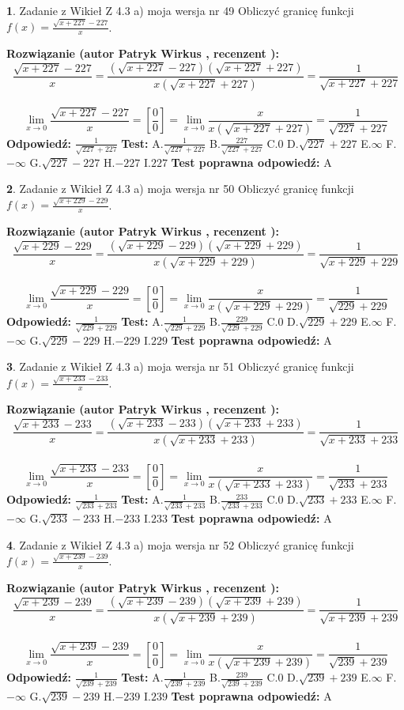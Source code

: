 \documentclass[12pt, a4paper]{article}
\theoremstyle{definition} %
\newtheorem{zad}{}
\newcommand{\zadStart}[1]{\begin{zad}#1\newline}
\newcommand{\zadStop}{\end{zad}}
\newcommand{\rozwStart}[2]{\noindent \textbf{Rozwiązanie (autor #1 , recenzent #2): }\newline}
\newcommand{\rozwStop}{\newline}
\newcommand{\odpStart}{\noindent \textbf{Odpowiedź:}\newline}
\newcommand{\odpStop}{\newline}
\newcommand{\testStart}{\noindent \textbf{Test:}\newline}
\newcommand{\testStop}{\newline}
\newcommand{\kluczStart}{\noindent \textbf{Test poprawna odpowiedź:}\newline}
\newcommand{\kluczStop}{\newline}
\begin{document}
\zadStart{Zadanie z Wikieł Z 4.3 a) moja wersja nr 49}
Obliczyć granicę funkcji $f(x)=\frac{\sqrt{x+227}-227}{x}$.
\zadStop
\rozwStart{Patryk Wirkus}{}
$$\frac{\sqrt{x+227}-227}{x}=\frac{(\sqrt{x+227}-227)(\sqrt{x+227}+227)}{x(\sqrt{x+227}+227)}=\frac{1}{\sqrt{x+227}+227}$$
\\
$$\lim\limits_{x\to0}\frac{\sqrt{x+227}-227}{x}=[\frac{0}{0}]=
\lim\limits_{x\to0}\frac{x}{x(\sqrt{x+227}+227)} = \frac{1}{\sqrt{227}+227}$$
\rozwStop
\odpStart
$\frac{1}{\sqrt{227}+227}$
\odpStop
\testStart
A.$\frac{1}{\sqrt{227}+227}$
B.$\frac{227}{\sqrt{227}+227}$
C.$0$
D.$\sqrt{227}+227$
E.$\infty$
F.$-\infty$
G.$\sqrt{227}-227$
H.$-227$
I.$227$
\testStop
\kluczStart
A
\kluczStop



\zadStart{Zadanie z Wikieł Z 4.3 a) moja wersja nr 50}
Obliczyć granicę funkcji $f(x)=\frac{\sqrt{x+229}-229}{x}$.
\zadStop
\rozwStart{Patryk Wirkus}{}
$$\frac{\sqrt{x+229}-229}{x}=\frac{(\sqrt{x+229}-229)(\sqrt{x+229}+229)}{x(\sqrt{x+229}+229)}=\frac{1}{\sqrt{x+229}+229}$$
\\
$$\lim\limits_{x\to0}\frac{\sqrt{x+229}-229}{x}=[\frac{0}{0}]=
\lim\limits_{x\to0}\frac{x}{x(\sqrt{x+229}+229)} = \frac{1}{\sqrt{229}+229}$$
\rozwStop
\odpStart
$\frac{1}{\sqrt{229}+229}$
\odpStop
\testStart
A.$\frac{1}{\sqrt{229}+229}$
B.$\frac{229}{\sqrt{229}+229}$
C.$0$
D.$\sqrt{229}+229$
E.$\infty$
F.$-\infty$
G.$\sqrt{229}-229$
H.$-229$
I.$229$
\testStop
\kluczStart
A
\kluczStop



\zadStart{Zadanie z Wikieł Z 4.3 a) moja wersja nr 51}
Obliczyć granicę funkcji $f(x)=\frac{\sqrt{x+233}-233}{x}$.
\zadStop
\rozwStart{Patryk Wirkus}{}
$$\frac{\sqrt{x+233}-233}{x}=\frac{(\sqrt{x+233}-233)(\sqrt{x+233}+233)}{x(\sqrt{x+233}+233)}=\frac{1}{\sqrt{x+233}+233}$$
\\
$$\lim\limits_{x\to0}\frac{\sqrt{x+233}-233}{x}=[\frac{0}{0}]=
\lim\limits_{x\to0}\frac{x}{x(\sqrt{x+233}+233)} = \frac{1}{\sqrt{233}+233}$$
\rozwStop
\odpStart
$\frac{1}{\sqrt{233}+233}$
\odpStop
\testStart
A.$\frac{1}{\sqrt{233}+233}$
B.$\frac{233}{\sqrt{233}+233}$
C.$0$
D.$\sqrt{233}+233$
E.$\infty$
F.$-\infty$
G.$\sqrt{233}-233$
H.$-233$
I.$233$
\testStop
\kluczStart
A
\kluczStop



\zadStart{Zadanie z Wikieł Z 4.3 a) moja wersja nr 52}
Obliczyć granicę funkcji $f(x)=\frac{\sqrt{x+239}-239}{x}$.
\zadStop
\rozwStart{Patryk Wirkus}{}
$$\frac{\sqrt{x+239}-239}{x}=\frac{(\sqrt{x+239}-239)(\sqrt{x+239}+239)}{x(\sqrt{x+239}+239)}=\frac{1}{\sqrt{x+239}+239}$$
\\
$$\lim\limits_{x\to0}\frac{\sqrt{x+239}-239}{x}=[\frac{0}{0}]=
\lim\limits_{x\to0}\frac{x}{x(\sqrt{x+239}+239)} = \frac{1}{\sqrt{239}+239}$$
\rozwStop
\odpStart
$\frac{1}{\sqrt{239}+239}$
\odpStop
\testStart
A.$\frac{1}{\sqrt{239}+239}$
B.$\frac{239}{\sqrt{239}+239}$
C.$0$
D.$\sqrt{239}+239$
E.$\infty$
F.$-\infty$
G.$\sqrt{239}-239$
H.$-239$
I.$239$
\testStop
\kluczStart
A
\kluczStop
\end{document}
